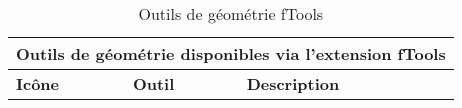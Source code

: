 \begin{table}[ht]
\centering
\caption{Outils de géométrie fTools}\label{tab:ftool_geometry}\medskip
 \begin{tabular}{|p{0.3in}|p{1.2in}|p{4.8in}|}
 \hline \multicolumn{3}{|c|}{\textbf{Outils de géométrie disponibles via l'extension fTools}} \\
 \hline \textbf{Icône} & \textbf{Outil} & \textbf{Description} \\

\end{tabular}
\end{table}

